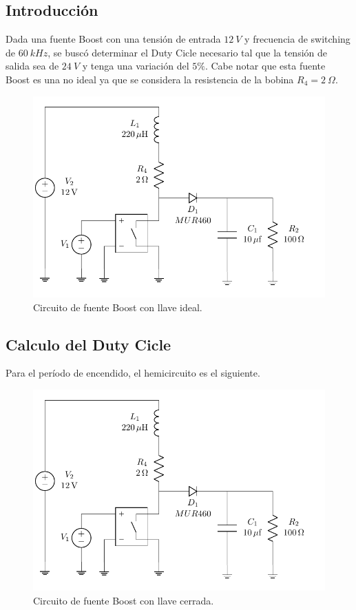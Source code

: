 



\subsection{Introducción}

Dada una fuente Boost con una tensión de entrada $12 \ V$ y frecuencia de switching de $60 \ kHz$, se buscó determinar el Duty Cicle necesario tal que la tensión de salida sea de $24 \ V$ y tenga una variación del $5\%$. Cabe notar que esta fuente Boost es una no ideal ya que se considera la resistencia de la bobina $R_4 = 2 \ \Omega$.

\begin{figure}[H]
	\centering
	\includegraphics[width=0.7\linewidth, page=1]{ImagenesEjercicio-2/CircuitsEj2}
	\caption{Circuito de fuente Boost con llave ideal.}
	\label{fig:ej2:circuito}
\end{figure}

\subsection{Calculo del Duty Cicle}

Para el período de encendido, el hemicircuito es el siguiente. 

\begin{figure}[H]
	\centering
	\includegraphics[width=0.8\linewidth, page=2]{ImagenesEjercicio-2/CircuitsEj2}
	\caption{Circuito de fuente Boost con llave cerrada.}
	\label{fig:ej2:circuito_off}
\end{figure}

